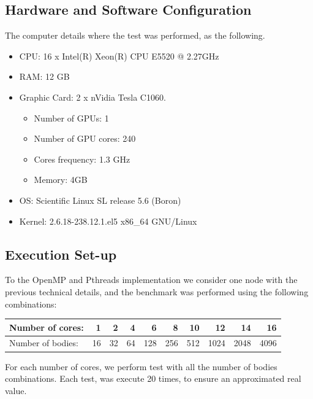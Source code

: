 \subsection{Hardware and Software Configuration}

The computer details where the test was performed,
as the following.

\begin{footnotesize}
\begin{itemize}
	\item CPU: 16 x Intel(R) Xeon(R) CPU E5520  @ 2.27GHz
	\item RAM: 12 GB
	\item Graphic Card: 2 x nVidia Tesla C1060.
	\begin{itemize}
		\item Number of GPUs: 1
		\item Number of GPU cores: 240
		\item Cores frequency: 1.3 GHz
		\item Memory: 4GB
	\end{itemize}
	\item OS: Scientific Linux SL release 5.6 (Boron)
	\item Kernel: 2.6.18-238.12.1.el5 x86\_64 GNU/Linux
\end{itemize}
\end{footnotesize}

\subsection{Execution Set-up}

To the OpenMP and Pthreads implementation
we consider one node with the previous technical details,
and the benchmark was performed using the following combinations:

\begin{center}
\begin{tiny}
\begin{tabular}{|l|r|r|r|r|r|r|r|r|r|}
	\hline
	Number of cores: & 1 & 2 & 4 & 6 & 8 & 10 & 12 & 14 & 16 \\
	\hline
	Number of bodies: & 16 & 32 & 64 & 128 & 256 & 512 & 1024 & 2048 & 4096 \\
	\hline
\end{tabular}
\end{tiny}
\end{center}

For each number of cores, we perform test with all the number of bodies combinations.
Each test, was execute 20 times, to ensure an approximated real value.

